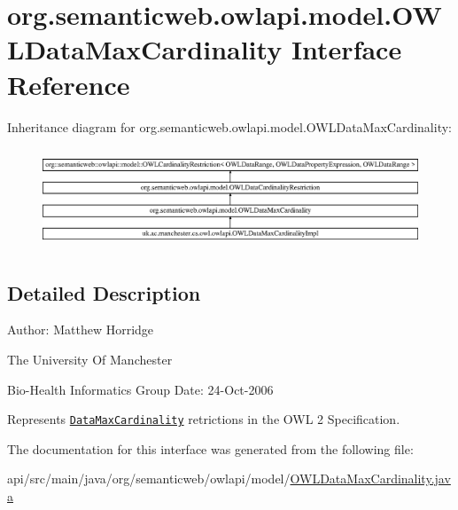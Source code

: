 \hypertarget{interfaceorg_1_1semanticweb_1_1owlapi_1_1model_1_1_o_w_l_data_max_cardinality}{\section{org.\-semanticweb.\-owlapi.\-model.\-O\-W\-L\-Data\-Max\-Cardinality Interface Reference}
\label{interfaceorg_1_1semanticweb_1_1owlapi_1_1model_1_1_o_w_l_data_max_cardinality}
}
Inheritance diagram for org.\-semanticweb.\-owlapi.\-model.\-O\-W\-L\-Data\-Max\-Cardinality\-:\begin{figure}[H]
\begin{center}
\leavevmode
\includegraphics[height=3.031123cm]{interfaceorg_1_1semanticweb_1_1owlapi_1_1model_1_1_o_w_l_data_max_cardinality}
\end{center}
\end{figure}


\subsection{Detailed Description}
Author\-: Matthew Horridge\par
 The University Of Manchester\par
 Bio-\/\-Health Informatics Group Date\-: 24-\/\-Oct-\/2006 

Represents \href{http://www.w3.org/TR/2009/REC-owl2-syntax-20091027/#Maximum_Cardinality_2}{\tt Data\-Max\-Cardinality} retrictions in the O\-W\-L 2 Specification. 

The documentation for this interface was generated from the following file\-:\begin{DoxyCompactItemize}
\item 
api/src/main/java/org/semanticweb/owlapi/model/\hyperlink{_o_w_l_data_max_cardinality_8java}{O\-W\-L\-Data\-Max\-Cardinality.\-java}\end{DoxyCompactItemize}
